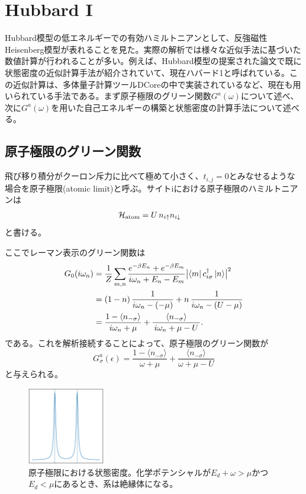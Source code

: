 \documentclass[12pt]{jarticle}
\begin{document}
\section{Hubbard \rm{I}}
Hubbard模型の低エネルギーでの有効ハミルトニアンとして、反強磁性Heisenberg模型が表れることを見た。実際の解析では様々な近似手法に基づいた数値計算が行われることが多い。例えば、Hubbard模型の提案された論文で既に状態密度の近似計算手法が紹介されていて、現在ハバード1と呼ばれている。この近似計算は、多体量子計算ツールDCoreの中で実装されているなど、現在も用いられている手法である。まず原子極限のグリーン関数$G^a(\omega)$について述べ、次に$G^a(\omega)$を用いた自己エネルギーの構築と状態密度の計算手法について述べる。
\subsection{原子極限のグリーン関数}
飛び移り積分がクーロン斥力に比べて極めて小さく、$t_{i,j} = 0$とみなせるような場合を原子極限(atomic limit)と呼ぶ。サイトiにおける原子極限のハミルトニアンは
\begin{align}
  \mathcal{H}_{\rm atom}
  &= U\,n_{i\uparrow}n_{i\downarrow}
\end{align}
と書ける。

ここでレーマン表示のグリーン関数は
\begin{align}
  G_0(i\omega_n)
  &= \frac{1}{Z}
     \sum_{m,n}
     \frac{e^{-\beta E_n} + e^{-\beta E_m}}
          {i\omega_n + E_n - E_m}
     \bigl|\langle m|\,c_{i\sigma}^\dagger\,|n\rangle\bigr|^2 \notag
  \\
  &= (1-n)\,\frac{1}{i\omega_n - ( -\mu )}
     + n\,\frac{1}{i\omega_n - (U-\mu)} \notag
  \\
  &= \frac{1-\langle n_{-\sigma} \rangle}{\,i\omega_n+\mu\,}
     +\frac{\langle n_{-\sigma} \rangle}{\,i\omega_n+\mu - U\,}.
\end{align}
である。これを解析接続することによって、原子極限のグリーン関数が
\begin{equation}
G_{\sigma}^a(\epsilon) = \frac{1-\langle n_{-\sigma} \rangle}{\omega + \mu} + \frac{\langle n_{-\sigma} \rangle}{\omega + \mu - U}
\end{equation}
と与えられる。

\begin{figure}[h]\label{fig:atomic-limit}
  \centering
  \includegraphics[width=0.3\textwidth]{dos_atomic_limit_square.eps}
  \caption{原子極限における状態密度。化学ポテンシャルが$E_d + \omega > \mu$かつ$E_d < \mu$にあるとき、系は絶縁体になる。}
\end{figure}
\end{document}
